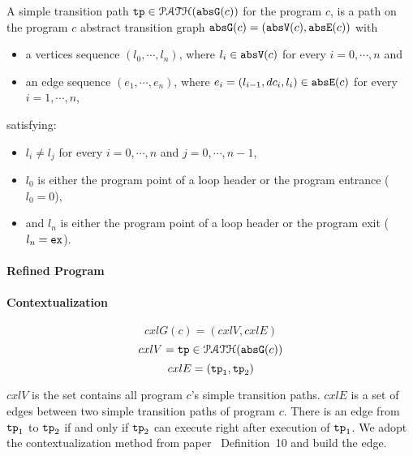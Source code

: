  \begin{defn}
    \label{def:tpath}
  A simple transition path
  $\mathtt{tp} \in \mathcal{PATH}(\mathtt{abs}{\mathtt{G}}(c))$ for the program $c$, is a path on the program $c$ abstract transition graph $\mathtt{abs}{\mathtt{G}}(c) = (\mathtt{abs}{\mathtt{V}}(c), \mathtt{abs}{\mathtt{E}}(c))$ with 
  \begin{itemize}
  \item a vertices sequence $(l_0, \cdots, l_n)$, where $l_i \in \mathtt{abs}{\mathtt{V}}(c)$ for every $i = 0, \cdots, n$ and
  \item an edge sequence $(e_1, \cdots, e_n)$, where $e_i = (l_{i - 1}, dc_i, l_{i}) \in \mathtt{abs}{\mathtt{E}}(c)$ for every $i = 1, \cdots, n$,
  \end{itemize}
  satisfying:
  \begin{itemize}
    \item $l_i \neq l_j$ for every $i = 0, \cdots, n$ and $j = 0, \cdots, {n - 1}$,
    \item $l_0$ is either the program point of a loop header or the program entrance ($l_0 = 0$),
    \item and $l_n$ is either the program point of a loop header or the program exit ($l_n = \mathtt{ex}$).
  \end{itemize}
  \end{defn}

\paragraph{Refined Program}
\paragraph{Contextualization}

\[
  cxlG(c) = (cxlV, cxlE)
  \]
  \[cxlV = \mathtt{tp} \in \mathcal{PATH}(\mathtt{abs}{\mathtt{G}}(c))
  \]
  \[
    cxlE = (\mathtt{tp}_1, \mathtt{tp}_2)\]

    $cxlV$ is the set contains all program $c$'s simple transition paths.
$cxlE$ is a set of edges between two simple transition paths of program $c$. There is an edge from $\mathtt{tp}_1$ to $\mathtt{tp}_2$
if and only if $\mathtt{tp}_2$ can execute right after execution of $\mathtt{tp}_1$.
We adopt the contextualization method from paper~\cite{ZulegerGSV11} Definition~10 and build the edge.
